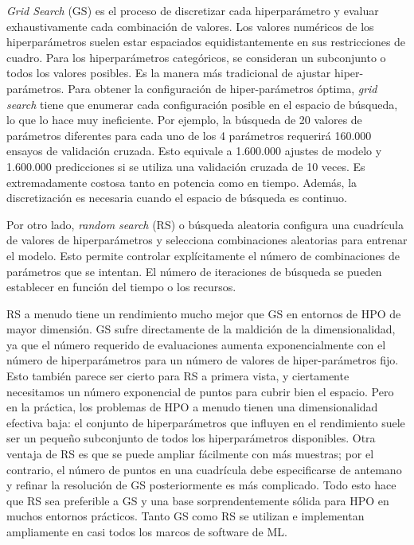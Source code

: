 \textit{Grid Search} (GS) es el proceso de discretizar cada hiperparámetro y evaluar exhaustivamente cada combinación de valores. Los valores numéricos de los hiperparámetros suelen estar espaciados equidistantemente en sus restricciones de cuadro. Para los hiperparámetros categóricos, se consideran un subconjunto o todos los valores posibles. Es la manera más tradicional de ajustar hiper-parámetros. Para obtener la configuración de hiper-parámetros óptima, \textit{grid search} tiene que enumerar cada configuración posible en el espacio de búsqueda, lo que lo hace muy ineficiente. Por ejemplo, la búsqueda de 20 valores de parámetros diferentes para cada uno de los 4 parámetros requerirá 160.000 ensayos de validación cruzada. Esto equivale a 1.600.000 ajustes de modelo y 1.600.000 predicciones si se utiliza una validación cruzada de 10 veces. Es extremadamente costosa tanto en potencia como en tiempo. Además, la discretización es necesaria cuando el espacio de búsqueda es continuo.

Por otro lado, \textit{random search} (RS) o búsqueda aleatoria configura una cuadrícula de valores de hiperparámetros y selecciona combinaciones aleatorias para entrenar el modelo. Esto permite controlar explícitamente el número de combinaciones de parámetros que se intentan. El número de iteraciones de búsqueda se pueden establecer en función del tiempo o los recursos.

RS a menudo tiene un rendimiento mucho mejor que GS en entornos de HPO de mayor dimensión. GS sufre directamente de la maldición de la dimensionalidad, ya que el número requerido de evaluaciones aumenta exponencialmente con el número de hiperparámetros para un número de valores de hiper-parámetros fijo. Esto también parece ser cierto para RS a primera vista, y ciertamente necesitamos un número exponencial de puntos para cubrir bien el espacio. Pero en la práctica, los problemas de HPO a menudo tienen una dimensionalidad efectiva baja: el conjunto de hiperparámetros que influyen en el rendimiento suele ser un pequeño subconjunto de todos los hiperparámetros disponibles. Otra ventaja de RS es que se puede ampliar fácilmente con más muestras; por el contrario, el número de puntos en una cuadrícula debe especificarse de antemano y refinar la resolución de GS posteriormente es más complicado. Todo esto hace que RS sea preferible a GS y una base sorprendentemente sólida para HPO en muchos entornos prácticos. Tanto GS como RS se utilizan e implementan ampliamente en casi todos los marcos de software de ML.


